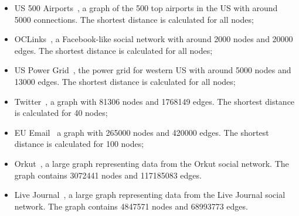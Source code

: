 \begin{itemize}
   \item US 500 Airports~\cite{usairports,tnet}, a graph of the 500 top airports in the US with around
      5000 connections. The shortest distance is calculated for all nodes;
      
   \item OCLinks~\cite{tnet,oclinks}, a Facebook-like social network with around 2000 nodes and 20000 edges. The shortest
      distance is calculated for all nodes;

   \item US Power Grid~\cite{tnet,uspowergrid}, the power grid for western US with around 5000
      nodes and 13000 edges. The shortest distance is calculated for all nodes;

   \item Twitter~\cite{snapnets,NIPS2012_4532}, a graph with 81306 nodes and 1768149 edges.
      The shortest distance is calculated for 40 nodes; 

   \item EU Email~\cite{snapnets,Leskovec:2007:GED:1217299.1217301} a graph with
      265000 nodes and 420000 edges. The shortest distance is calculated for 100
      nodes;

   \item Orkut~\cite{snapnets,Yang:2012:DEN:2350190.2350193}, a large graph
      representing data from the Orkut social network. The graph contains
      3072441 nodes and 117185083 edges.

   \item Live Journal~\cite{snapnets,Backstrom06groupformation}, a large graph representing data from the
      Live Journal social network. The graph contains 4847571 nodes and 68993773
      edges.

\end{itemize}

